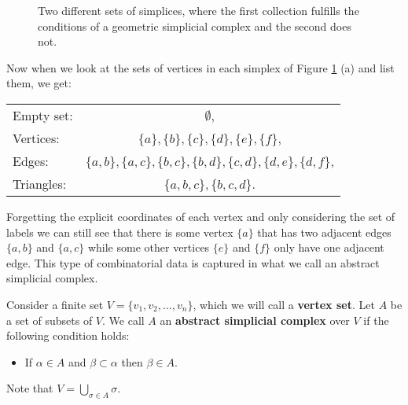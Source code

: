 \begin{figure}[H]
\begin{subfigure}[c]{0.49\textwidth}
\begin{center}

\end{center}
\end{subfigure}
\begin{subfigure}[c]{0.49\textwidth}
\begin{center}

\end{center}
\end{subfigure}
\caption{Two different sets of simplices, where the first collection fulfills the conditions of a geometric simplicial complex and the second does not.}
\label{fig:simplicial_complexes}
\end{figure}


Now when we look at the sets of vertices in each simplex of Figure \ref{fig:simplicial_complexes} (a) and list them, we get:
\begin{center}
    \begin{tabular}{lc}
        Empty set: & $\emptyset$, \\
        Vertices: & $\{a\}, \{b\}, \{c\}, \{d\}, \{e\}, \{f\}$, \\
        Edges: & $\{a,b\},\{a,c\},\{b,c\},\{b,d\},\{c,d\},\{d,e\},\{d,f\}$, \\
        Triangles: & $\{a,b,c\}, \{b,c,d\}$.
    \end{tabular}
\end{center}

Forgetting the explicit coordinates of each vertex and only considering the set of labels we can still see that there is some vertex $\{a\}$ that has two adjacent edges $\{a,b\}$ and $\{a,c\}$ while some other vertices $\{e\}$ and $\{f\}$ only have one adjacent edge. 
This type of combinatorial data is captured in what we call an abstract simplicial complex.

\begin{defi}
    Consider a finite set $V = \{v_1, v_2, \dots ,v_n\}$, which we will call a \textbf{vertex set}.
    Let $A$ be a set of subsets of $V$. 
    We call $A$ an \textbf{abstract simplicial complex} over $V$ if the following condition holds:
    \begin{itemize}
    	\item If $\alpha \in A$ and $\beta \subset \alpha$ then $\beta \in A$.
    \end{itemize}
    Note that $V = \bigcup_{\sigma \in A} \sigma$.
\end{defi}

